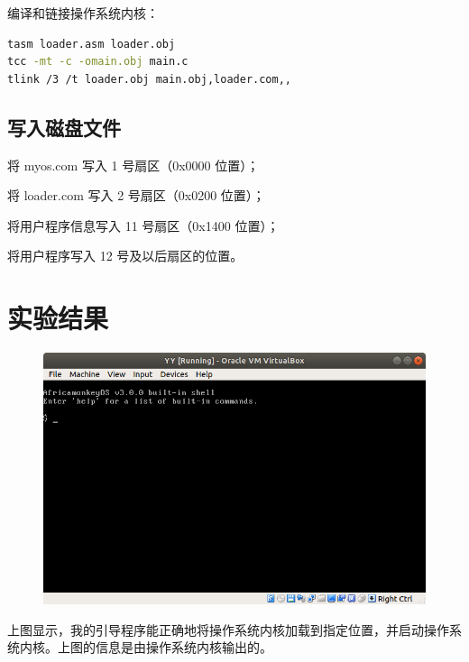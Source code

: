 \documentclass{article}
\begin{document}
编译和链接操作系统内核：

\begin{lstlisting}[language=bash]
tasm loader.asm loader.obj
tcc -mt -c -omain.obj main.c
tlink /3 /t loader.obj main.obj,loader.com,,
\end{lstlisting}

\subsection{写入磁盘文件}

将 myos.com 写入 1 号扇区（0x0000 位置）；

将 loader.com 写入 2 号扇区（0x0200 位置）；

将用户程序信息写入 11 号扇区（0x1400 位置）；

将用户程序写入 12 号及以后扇区的位置。

\newpage 

\section{实验结果}


\begin{figure}[!hbp]
	\centering
	\includegraphics[scale=0.55]{pics/1.png}
\end{figure}

上图显示，我的引导程序能正确地将操作系统内核加载到指定位置，并启动操作系统内核。上图的信息是由操作系统内核输出的。
\end{document}
